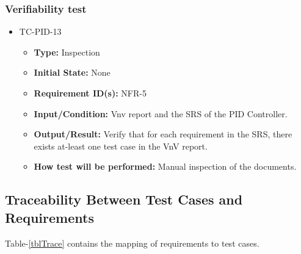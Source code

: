 \documentclass[12pt, titlepage]{article}
\begin{document}
\subsubsection{Verifiability test}

\begin{itemize}
\item{TC-PID-13\\}
\begin{itemize}
\item{\textbf{Type:}} Inspection
					
\item{\textbf{Initial State:}} None

\item{\textbf{Requirement ID(s):}} NFR-5
					
\item{\textbf{Input/Condition:}} Vnv report and the SRS of the PID Controller.
					
\item{\textbf{Output/Result:}} Verify that for each requirement in the SRS, there
exists at-least one test case in the VnV report.
 
\item{\textbf{How test will be performed:}} Manual inspection of the documents.
\end{itemize}
\end{itemize}
\subsection{Traceability Between Test Cases and Requirements}


Table-\ref{tblTrace} contains the mapping of requirements to test cases.
  
\end{document}
